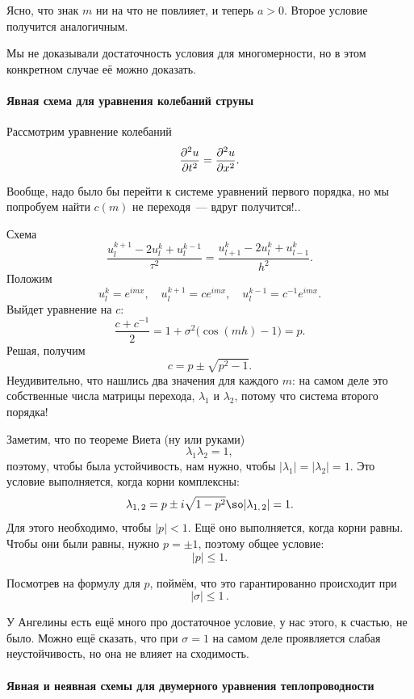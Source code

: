 \documentclass{trlnotes}
\begin{document}
Ясно, что знак $m$ ни на что не повлияет, и теперь $a > 0$. Второе условие получится аналогичным.

\begin{rem}
	Мы не доказывали достаточность условия для многомерности, но в этом конкретном случае её можно доказать.
\end{rem}

\paragraph{Явная схема для уравнения колебаний струны}

Рассмотрим уравнение колебаний
\[
	\dfrac{\partial^2 u}{\partial t^2} = \dfrac{\partial^2 u}{\partial x^2}.
\]

Вообще, надо было бы перейти к системе уравнений первого порядка, но мы попробуем найти $c(m)$ не переходя~--- вдруг получится!..

Схема
\[
	\dfrac{u_l^{k + 1} - 2u_l^k + u_l^{k-1}}{\tau^2} = \dfrac{u^k_{l+1} - 2u^k_l + u^k_{l-1}}{h^2}.
\]
Положим
\[
	u_l^k = e^{imx}, \quad u_l^{k+1} = ce^{imx}, \quad u_l^{k-1} = c^{-1} e^{imx}.
\]
Выйдет уравнение на $c$:
\[
	\dfrac{c + c^{-1}}{2} = 1 + \sigma^2\big(\cos(mh) - 1\big) = p.
\]
Решая, получим
\[
	c = p \pm \sqrt{p^2 - 1}.
\]
Неудивительно, что нашлись два значения для каждого $m$: на самом деле это собственные числа матрицы перехода, $\lambda_1$ и $\lambda_2$, потому что система второго порядка!

Заметим, что по теореме Виета (ну или руками) 
\[
	\lambda_1 \lambda_2 = 1,
\]
поэтому, чтобы была устойчивость, нам нужно, чтобы $|\lambda_1| = |\lambda_2| = 1$. Это условие выполняется, когда корни комплексны:
\[
	\lambda_{1, \, 2} = p \pm i\sqrt{1 - p^2} \so |\lambda_{1, \, 2}| = 1.
\]
Для этого необходимо, чтобы $|p| < 1$. Ещё оно выполняется, когда корни равны. Чтобы они были равны, нужно $p = \pm 1$, поэтому общее условие:
\[
	|p| \leqslant 1.
\]

Посмотрев на формулу для $p$, поймём, что это гарантированно происходит при 
\[
	\boxed{|\sigma| \leqslant 1}\,.
\]

\begin{rem}
	У Ангелины есть ещё много про достаточное условие, у нас этого, к счастью, не было. Можно ещё сказать, что при $\sigma = 1$ на самом деле проявляется слабая неустойчивость, но она не влияет на сходимость.
\end{rem}

\paragraph{Явная и неявная схемы для двумерного уравнения теплопроводности}
\end{document}
